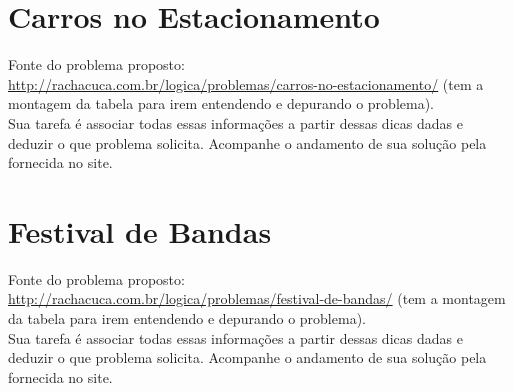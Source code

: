 \documentclass[a4paper,12pt]{article}
\begin{document}
\section{Carros no Estacionamento}

 Fonte do problema proposto:\\
 \url{http://rachacuca.com.br/logica/problemas/carros-no-estacionamento/}
 (tem a montagem da tabela para irem entendendo e depurando o problema).\\


\vspace{1.5cm}
 Sua tarefa é associar todas essas informações a partir dessas dicas dadas e deduzir o que problema solicita. Acompanhe o andamento de sua solução pela fornecida no site.
\newpage
\section{Festival de Bandas}

 Fonte do problema proposto:\\
 \url{http://rachacuca.com.br/logica/problemas/festival-de-bandas/}
 (tem a montagem da tabela para irem entendendo e depurando o problema).\\

\vspace{1.5cm}
 Sua tarefa é associar todas essas informações a partir dessas dicas dadas e deduzir o que problema solicita. Acompanhe o andamento de sua solução pela fornecida no site.
\end{document}
